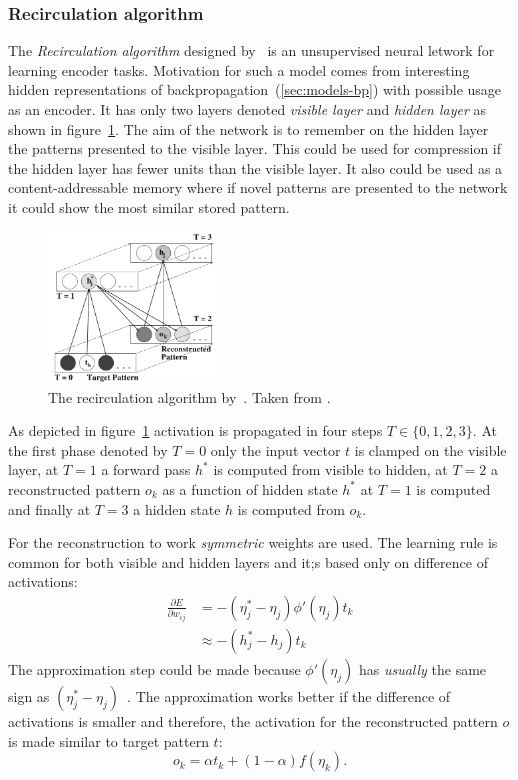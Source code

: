 \subsubsection{Recirculation algorithm}
\label{sec:models-recirc} 

The \emph{Recirculation algorithm} designed by~\citet{hinton1988learning} is an unsupervised neural letwork for learning encoder tasks. Motivation for such a model comes from interesting hidden representations of backpropagation~(\ref{sec:models-bp}) with possible usage as an encoder. It has only two layers denoted \emph{visible layer} and \emph{hidden layer} as shown in figure~\ref{fig:models-recirc}. The aim of the network is to remember on the hidden layer the patterns presented to the visible layer. This could be used for compression if the hidden layer has fewer units than the visible layer. It also could be used as a content-addressable memory where if novel patterns are presented to the network it could show the most similar stored pattern. 

\begin{figure}[H]
  \centering
\includegraphics[width=0.4\textwidth]{img/recirculation.png}
  \caption{The recirculation algorithm by~\citet{hinton1988learning}. Taken from \citep{o1996bio}.}
  \label{fig:models-recirc}
\end{figure}

As depicted in figure~\ref{fig:models-recirc} activation is propagated in four steps $T \in \{0,1,2,3\}$. At the first phase denoted by $T=0$ only the input vector $t$ is clamped on the visible layer, at $T=1$ a forward pass $h^{*}$ is computed from visible to hidden, at $T=2$ a reconstructed pattern $o_k$ as a function of hidden state $h^{*}$ at $T=1$ is computed and finally at $T=3$ a hidden state $h$ is computed from $o_k$.

For the reconstruction to work \emph{symmetric} weights are used. The learning rule is common for both visible and hidden layers and it;s based only on difference of activations: 
\begin{align}
\frac{\partial E}{\partial w_{ij}} &= -(\eta^{*}_j - \eta_j) \phi'(\eta_j) t_k \nonumber \\
&\approx -(h^{*}_j - h_j)t_k \nonumber 
\end{align} 
The approximation step could be made because $\phi'(\eta_j)$ has \emph{usually} the same sign as $(\eta^{*}_j - \eta_j) $~\citep{hinton1988learning, o1996bio}. The approximation works better if the difference of activations is smaller and therefore, the activation for the reconstructed pattern $o$  is made similar to target pattern $t$: 
\begin{equation}
o_k = \alpha t_k + (1-\alpha)f(\eta_k). 
\end{equation} 

